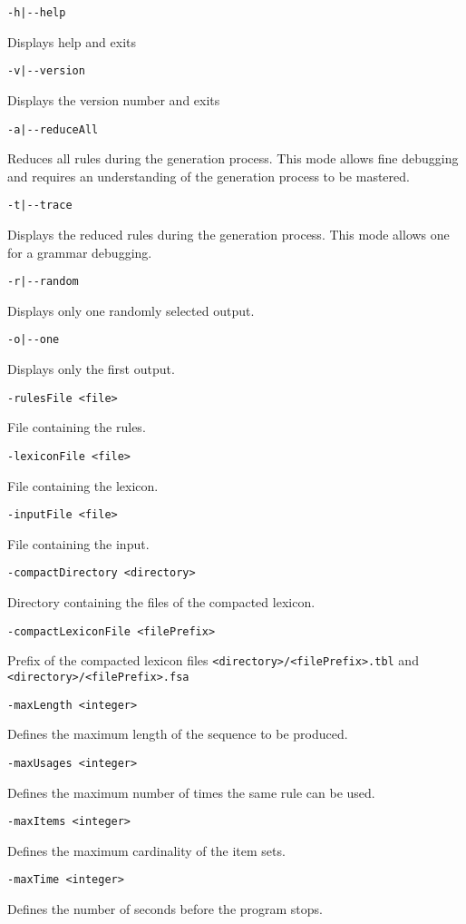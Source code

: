 \documentclass[11pt]{article}
\begin{document}
\begin{description}
\item \verb#-h|--help#

Displays help and exits

\item \verb#-v|--version#

Displays the version number and exits

\item \verb#-a|--reduceAll#

  Reduces all rules during the generation process. This mode
  allows fine debugging and requires an understanding of the
  generation process to be mastered.

\item \verb#-t|--trace#

  Displays the reduced rules during the generation process. This mode allows one for a
  grammar debugging.

\item \verb#-r|--random#
  
  Displays only one randomly selected output.
  
\item \verb#-o|--one#
  
  Displays only the first output.
  
\item \verb#-rulesFile <file>#
  
  File containing the rules.
  
\item \verb#-lexiconFile <file>#
  
  File containing the lexicon. 

\item \verb#-inputFile <file>#
  
  File containing the input. 
  
\item \verb#-compactDirectory <directory>#

  Directory containing the files of the compacted lexicon.

\item \verb#-compactLexiconFile <filePrefix>#

  Prefix of the compacted lexicon files
  \verb#<directory>/<filePrefix>.tbl# and
  \verb#<directory>/<filePrefix>.fsa#
  
\item \verb#-maxLength <integer>#

  Defines the maximum length of the sequence to be produced.

\item \verb#-maxUsages <integer>#

  Defines the maximum number of times the same rule can be used.

\item \verb#-maxItems <integer>#

  Defines the maximum cardinality of the item sets.

\item \verb#-maxTime <integer>#

  Defines the number of seconds before the program stops.

\end{description}
\end{document}
